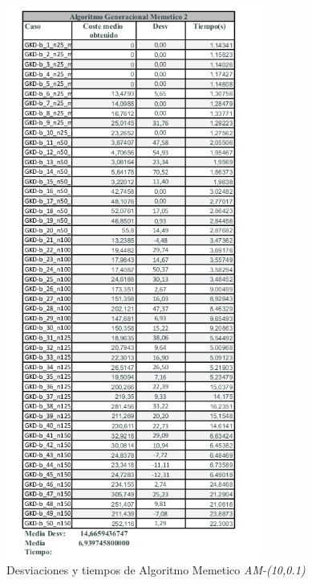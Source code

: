 \documentclass{article}
\begin{document}
\begin{figure}[h]
  \centering
  \includegraphics[width=0.75\textwidth]{capturastablas/Memetico2.png}
  \caption{Desviaciones y tiempos de Algoritmo Memetico \emph{AM-(10,0.1)}}
\end{figure}
\end{document}

